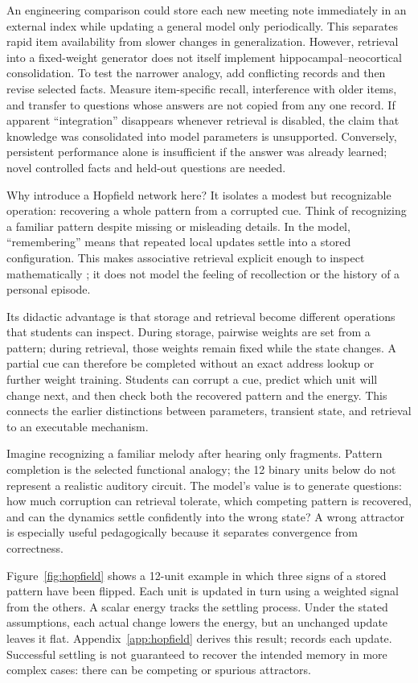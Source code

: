 \documentclass[11pt,a4paper]{article}
\begin{document}
An engineering comparison could store each new meeting note immediately in an external index while updating a general model only periodically. This separates rapid item availability from slower changes in generalization. However, retrieval into a fixed-weight generator does not itself implement hippocampal--neocortical consolidation. To test the narrower analogy, add conflicting records and then revise selected facts. Measure item-specific recall, interference with older items, and transfer to questions whose answers are not copied from any one record. If apparent ``integration'' disappears whenever retrieval is disabled, the claim that knowledge was consolidated into model parameters is unsupported. Conversely, persistent performance alone is insufficient if the answer was already learned; novel controlled facts and held-out questions are needed.

Why introduce a Hopfield network here? It isolates a modest but recognizable operation: recovering a whole pattern from a corrupted cue. Think of recognizing a familiar pattern despite missing or misleading details. In the model, ``remembering'' means that repeated local updates settle into a stored configuration. This makes associative retrieval explicit enough to inspect mathematically \citep{hopfield1982}; it does not model the feeling of recollection or the history of a personal episode.

Its didactic advantage is that storage and retrieval become different operations that students can inspect. During storage, pairwise weights are set from a pattern; during retrieval, those weights remain fixed while the state changes. A partial cue can therefore be completed without an exact address lookup or further weight training. Students can corrupt a cue, predict which unit will change next, and then check both the recovered pattern and the energy. This connects the earlier distinctions between parameters, transient state, and retrieval to an executable mechanism.

Imagine recognizing a familiar melody after hearing only fragments. Pattern completion is the selected functional analogy; the 12 binary units below do not represent a realistic auditory circuit. The model's value is to generate questions: how much corruption can retrieval tolerate, which competing pattern is recovered, and can the dynamics settle confidently into the wrong state? A wrong attractor is especially useful pedagogically because it separates convergence from correctness.

Figure~\ref{fig:hopfield} shows a 12-unit example in which three signs of a stored pattern have been flipped. Each unit is updated in turn using a weighted signal from the others. A scalar energy tracks the settling process. Under the stated assumptions, each actual change lowers the energy, but an unchanged update leaves it flat. Appendix~\ref{app:hopfield} derives this result;  records each update. Successful settling is not guaranteed to recover the intended memory in more complex cases: there can be competing or spurious attractors.
\end{document}

